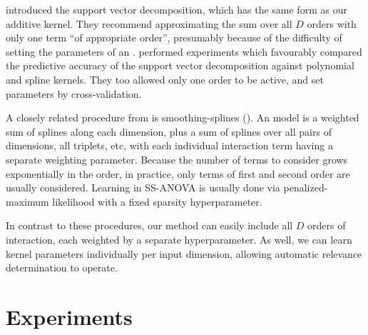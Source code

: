 \citet{vapnik1998statistical} introduced the support vector \ANOVA{} decomposition, which has the same form as our additive kernel.
They recommend approximating the sum over all $D$ orders with only one term ``of appropriate order'', presumably because of the difficulty of setting the parameters of an \SVM{}.
\citet{stitson1999support} performed experiments which favourably compared the predictive accuracy of the support vector \ANOVA{} decomposition against polynomial and spline kernels.
They too allowed only one order to be active, and set parameters by cross-validation.
%

A closely related procedure from \citet{wahba1990spline} is smoothing-splines \ANOVA{} (\SSANOVA{}).
An \SSANOVA{} model is a weighted sum of splines along each dimension, plus a sum of splines over all pairs of dimensions, all triplets, etc, with each individual interaction term having a separate weighting parameter.
Because the number of terms to consider grows exponentially in the order, in practice, only terms of first and second order are usually considered.
Learning in SS-ANOVA is usually done via penalized-maximum likelihood with a fixed sparsity hyperparameter.


In contrast to these procedures, our method can easily include all $D$ orders of interaction, each weighted by a separate hyperparameter.
As well, we can learn kernel parameters individually per input dimension, allowing automatic relevance determination to operate.







\section{Experiments}

